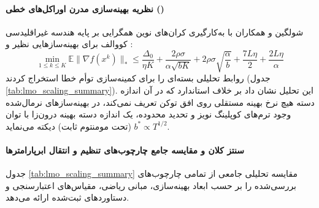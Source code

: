 \paragraph*{نظریه بهینه‌سازی مدرن اوراکل‌های خطی ()}
شولگین و همکاران \cite{shulgin2026lmo} با به‌کارگیری کران‌های نوین همگرایی  بر پایه هندسه غیراقلیدسی کووالف برای بهینه‌سازهایی نظیر  و :
\begin{equation}
    \min_{1 \le k \le K} \mathbb{E}\|\nabla f(x^k)\|_* \le \frac{\Delta_0}{\eta K} + \frac{2\rho\sigma}{\alpha\sqrt{bK}} + 2\rho\sigma\sqrt{\frac{\alpha}{b}} + \frac{7L\eta}{2} + \frac{2L\eta}{\alpha}
\end{equation}
روابط تحلیلی بسته‌ای را برای کمینه‌سازی توأم خطا استخراج کردند (جدول \ref{tab:lmo_scaling_summary}). این تحلیل نشان داد بر خلاف  استاندارد که در آن اندازه دسته هیچ نرخ بهینه مستقلی روی افق توکن تعریف نمی‌کند، در بهینه‌سازهای نرمال‌شده وجود ترم‌های کوپلینگ نویز و تحدید محدوده، یک اندازه دسته بهینه درون‌زا با توان $b^* \propto T^{1/2}$ (تحت مومنتوم ثابت) دیکته می‌نماید.

\paragraph*{سنتز کلان و مقایسه جامع چارچوب‌های تنظیم و انتقال ابرپارامترها}
جدول \ref{tab:lmo_scaling_summary} مقایسه تحلیلی جامعی از تمامی چارچوب‌های بررسی‌شده را بر حسب ابعاد بهینه‌سازی، مبانی ریاضی، مقیاس‌های اعتبارسنجی و دستاوردهای ثبت‌شده ارائه می‌دهد.

